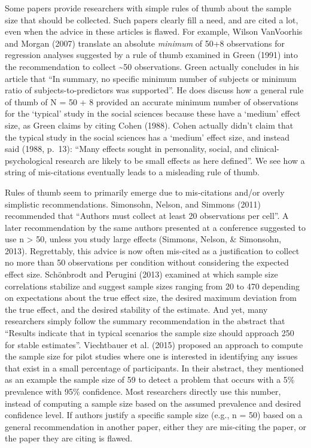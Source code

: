 \documentclass[
  english,
  ,jou, a4paper,floatsintext]{apa6}
\begin{document}
Some papers provide researchers with simple rules of thumb about the sample size that should be collected. Such papers clearly fill a need, and are cited a lot, even when the advice in these articles is flawed. For example, Wilson VanVoorhis and Morgan (2007) translate an absolute \emph{minimum} of 50+8 observations for regression analyses suggested by a rule of thumb examined in Green (1991) into the recommendation to collect \textasciitilde50 observations. Green actually concludes in his article that ``In summary, no specific minimum number of subjects or minimum ratio of subjects-to-predictors was supported''. He does discuss how a general rule of thumb of N = 50 + 8 provided an accurate minimum number of observations for the `typical' study in the social sciences because these have a `medium' effect size, as Green claims by citing Cohen (1988). Cohen actually didn't claim that the typical study in the social sciences has a `medium' effect size, and instead said (1988, p.~13): ``Many effects sought in personality, social, and clinical-psychological research are likely to be small effects as here defined''. We see how a string of mis-citations eventually leads to a misleading rule of thumb.

Rules of thumb seem to primarily emerge due to mis-citations and/or overly simplistic recommendations. Simonsohn, Nelson, and Simmons (2011) recommended that ``Authors must collect at least 20 observations per cell''. A later recommendation by the same authors presented at a conference suggested to use n \textgreater{} 50, unless you study large effects (Simmons, Nelson, \& Simonsohn, 2013). Regrettably, this advice is now often mis-cited as a justification to collect no more than 50 observations per condition without considering the expected effect size. Schönbrodt and Perugini (2013) examined at which sample size correlations stabilize and suggest sample sizes ranging from 20 to 470 depending on expectations about the true effect size, the desired maximum deviation from the true effect, and the desired stability of the estimate. And yet, many researchers simply follow the summary recommendation in the abstract that ``Results indicate that in typical scenarios the sample size should approach 250 for stable estimates''. Viechtbauer et al. (2015) proposed an approach to compute the sample size for pilot studies where one is interested in identifying any issues that exist in a small percentage of participants. In their abstract, they mentioned as an example the sample size of 59 to detect a problem that occurs with a 5\% prevalence with 95\% confidence. Most researchers directly use this number, instead of computing a sample size based on the assumed prevalence and desired confidence level. If authors justify a specific sample size (e.g., n = 50) based on a general recommendation in another paper, either they are mis-citing the paper, or the paper they are citing is flawed.
\end{document}
